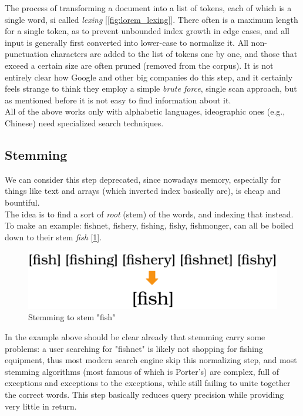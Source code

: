 The process of transforming a document into a list of tokens, each of which is a single word, si called \textit{lexing} [\ref{fig:lorem_lexing}]. There often is a maximum length for a single token, as to prevent unbounded index growth in edge cases, and all input is generally first converted into lower-case to normalize it. All non-punctuation characters are added to the list of tokens one by one, and those that exceed a certain size are often pruned (removed from the corpus). It is not entirely clear how Google and other big companies do this step, and it certainly feels strange to think they employ a simple \textit{brute force}, single scan approach, but as mentioned before it is not easy to find information about it. \\
All of the above works only with alphabetic languages, ideographic ones (e.g., Chinese) need specialized search techniques. 

\subsection{Stemming}

We can consider this step deprecated, since nowadays memory, especially for things like text and arrays (which inverted index basically are), is cheap and bountiful. \\
The idea is to find a sort of \textit{root} (stem) of the words, and indexing that instead. To make an example: fishnet, fishery, fishing, fishy, fishmonger, can all be boiled down to their stem \textit{fish} [\ref{fig:fishstem}]. 

\begin{figure}[ht] 
\begin{center}
\includegraphics[width=.8\textwidth]{imgs/stemming.png}
\caption{Stemming to stem "fish"\label{fig:fishstem}}
\end{center}
\end{figure}

In the example above should be clear already that stemming carry some problems: a user searching for "fishnet" is likely not shopping for fishing equipment, thus most modern search engine skip this normalizing step, and most stemming algorithms (most famous of which is Porter's) are complex, full of exceptions and exceptions to the exceptions, while still failing to unite together the correct words. This step basically reduces query precision while providing very little in return.

